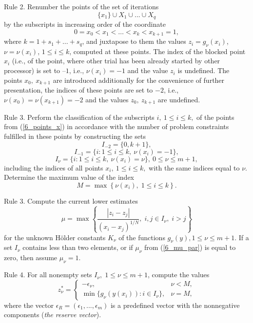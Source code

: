 Rule 2. Renumber the points of the set of iterations
\[
\{x_1\} \cup X_1 \cup ... \cup X_q
\]
by the subscripts in increasing order of the coordinate
\begin{equation}\label{6_points_x} 
	0=x_0<x_1< \dots <x_k<x_{k+1}=1,
\end{equation}
where $k=1+s_1+\dots+s_q$, and juxtapose to them the values $z_i=g_\nu(x_i)$, $\nu = \nu(x_i)$, $1 \leq i \leq k$, computed at these points. The index of the blocked point $x_i$ (i.e., of the point, where other trial has been already started by other processor) is set to $–1$, i.e., $\nu(x_i)=-1$ and the value $z_i$ is undefined. The points $x_0,\ x_{k+1}$ are introduced additionally for the convenience of further presentation, the indices of these points are set to $-2$, i.e., $\nu(x_0)=\nu(x_{k+1})=-2$ and the values $z_0,\ z_{k+1}$ are undefined.

Rule 3. Perform the classification of the subscripts $i,\ 1 \leq i \leq k,$ of the points from (\ref{6_points_x}) in accordance with  the number of problem constraints fulfilled in these points by constructing the sets
\[
I_{-2} = \{0, k+1\},
\]
\[
I_{-1} = \{i: 1 \leq i \leq k,\ \nu(x_i)=-1\},
\]
\[
I_{\nu} = \{i: 1 \leq i \leq k,\ \nu(x_i)=\nu\},\ 0 \leq \nu \leq m+1,
\]
including the indices of all points $x_i,\ 1 \leq i \leq k,$ with the same indices equal to $\nu$. 
Determine the maximum value of the index
\[
M=\max\left\{\nu(x_i), \; 1 \leq i \leq k \right \}.
\]

Rule 3. Compute the current lower estimates
\begin{equation}\label{6_mu_par}
\mu = \max\left\{ \frac{\left|z_i-z_j\right|}{ (x_i - x_j)^{1/N} }, \; i,j \in I_\nu, \; i>j \right\}
\end{equation}
for the unknown H{\"o}lder constants $K_\nu$ of the functions $g_\nu(y),1
\leq \nu \leq m+1$. If a set $I_\nu$ contains less than two elements, or
if $\mu_\nu$ from (\ref{6_mu_par}) is equal to zero, then assume $\mu_\nu=1$.

Rule 4. For all nonempty sets $I_\nu, \; 1 \leq \nu \leq m+1$, compute the
values
\begin{equation}\label{6_z_nu}
z_\nu^\ast = \left\{
   \begin{array}{lr}
     -\epsilon_\nu, & \nu < M,\\
     \min\{ g_\nu(y(x_i)): i\in I_\nu \}, & \nu = M,
   \end{array}
\right.
\end{equation}
where the vector $\epsilon_R = (\epsilon_1,...,\epsilon_m)$ is a predefined vector with the nonnegative components (\textit{the reserve vector}).


